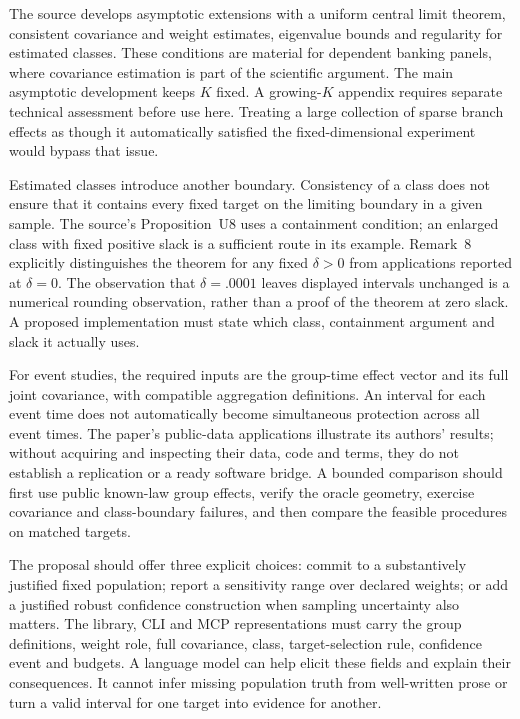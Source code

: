 The source develops asymptotic extensions with a uniform central limit theorem,
consistent covariance and weight estimates, eigenvalue bounds and regularity
for estimated classes. These conditions are material for dependent banking
panels, where covariance estimation is part of the scientific argument.
The main asymptotic development keeps $K$ fixed. A growing-$K$ appendix
requires separate technical assessment before use here. Treating a large
collection of sparse branch effects as though it automatically satisfied the
fixed-dimensional experiment would bypass that issue.

Estimated classes introduce another boundary. Consistency of a class does not
ensure that it contains every fixed target on the limiting boundary in a given
sample. The source's Proposition~U8 uses a containment condition; an enlarged
class with fixed positive slack is a sufficient route in its example.
Remark~8 explicitly distinguishes the theorem for any fixed $\delta>0$ from
applications reported at $\delta=0$. The observation that $\delta=.0001$
leaves displayed intervals unchanged is a numerical rounding observation,
rather than a proof of the theorem at zero slack. A proposed implementation
must state which class, containment argument and slack it actually uses.

For event studies, the required inputs are the group-time effect vector and
its full joint covariance, with compatible aggregation definitions. An interval
for each event time does not automatically become simultaneous protection
across all event times. The paper's public-data applications illustrate its
authors' results; without acquiring and inspecting their data, code and terms,
they do not establish a replication or a ready software bridge. A bounded
comparison should first use public known-law group effects, verify the oracle
geometry, exercise covariance and class-boundary failures, and then compare
the feasible procedures on matched targets.

The proposal should offer three explicit choices: commit to a substantively
justified fixed population; report a sensitivity range over declared weights;
or add a justified robust confidence construction when sampling uncertainty
also matters. The library, CLI and MCP representations must carry the group
definitions, weight role, full covariance, class, target-selection rule,
confidence event and budgets. A language model can help elicit these fields
and explain their consequences. It cannot infer missing population truth from
well-written prose or turn a valid interval for one target into evidence for
another.


